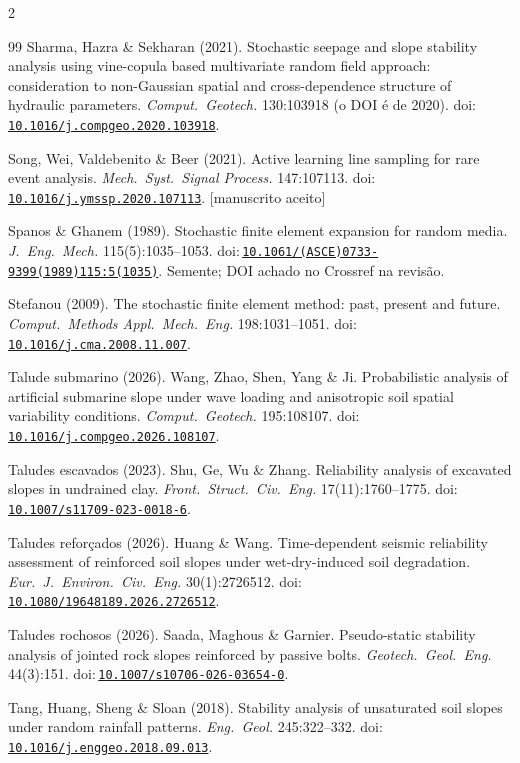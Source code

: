 \documentclass[11pt,a4paper]{article}
\newcommand{\doi}[1]{doi:\,\href{https://doi.org/#1}{\nolinkurl{#1}}}
\begin{document}
\begin{multicols}{2}
\begin{thebibliography}{99}
 Sharma, Hazra \& Sekharan (2021). Stochastic seepage and slope stability
analysis using vine-copula based multivariate random field approach: consideration to non-Gaussian spatial and
cross-dependence structure of hydraulic parameters. \emph{Comput.\ Geotech.} 130:103918 (o DOI é de 2020).
\doi{10.1016/j.compgeo.2020.103918}.

 Song, Wei, Valdebenito \& Beer (2021). Active learning line sampling for rare
event analysis. \emph{Mech.\ Syst.\ Signal Process.} 147:107113. \doi{10.1016/j.ymssp.2020.107113}. [manuscrito
aceito]

 Spanos \& Ghanem (1989). Stochastic finite element expansion for random
media. \emph{J.\ Eng.\ Mech.} 115(5):1035--1053. \doi{10.1061/(ASCE)0733-9399(1989)115:5(1035)}. Semente; DOI achado
no Crossref na revisão.

 Stefanou (2009). The stochastic finite element method: past, present and future.
\emph{Comput.\ Methods Appl.\ Mech.\ Eng.} 198:1031--1051. \doi{10.1016/j.cma.2008.11.007}.

 Talude submarino (2026). Wang, Zhao, Shen, Yang \& Ji. Probabilistic
analysis of artificial submarine slope under wave loading and anisotropic soil spatial variability conditions.
\emph{Comput.\ Geotech.} 195:108107. \doi{10.1016/j.compgeo.2026.108107}.

 Taludes escavados (2023). Shu, Ge, Wu \& Zhang. Reliability analysis
of excavated slopes in undrained clay. \emph{Front.\ Struct.\ Civ.\ Eng.} 17(11):1760--1775.
\doi{10.1007/s11709-023-0018-6}.

 Taludes reforçados (2026). Huang \& Wang. Time-dependent seismic
reliability assessment of reinforced soil slopes under wet-dry-induced soil degradation. \emph{Eur.\ J.\ Environ.\ Civ.\
Eng.} 30(1):2726512. \doi{10.1080/19648189.2026.2726512}.

 Taludes rochosos (2026). Saada, Maghous \& Garnier. Pseudo-static
stability analysis of jointed rock slopes reinforced by passive bolts. \emph{Geotech.\ Geol.\ Eng.} 44(3):151.
\doi{10.1007/s10706-026-03654-0}.

 Tang, Huang, Sheng \& Sloan (2018). Stability analysis of unsaturated soil slopes
under random rainfall patterns. \emph{Eng.\ Geol.} 245:322--332. \doi{10.1016/j.enggeo.2018.09.013}.


\end{thebibliography}
\end{multicols}
\end{document}
